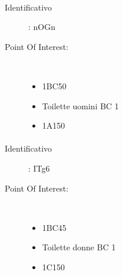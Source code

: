 \documentclass[../SperimentazioniPratiche.tex]{subfiles}
\begin{document}
			\paragraph*{}
			\label{01001}
			\begin{tcolorbox}[fonttitle=\bfseries, 
								adjusted title={\Large Beacon 01001},
								sharp corners=south,
								colback=white, 
								colframe=white!50!blue!75!black]
								
				\begin{description}
					\item[Identificativo]: nOGn

					\tcbline					
					
					\item[Point Of Interest:] \ \par
					\begin{itemize}
						\item 1BC50
						\item Toilette uomini BC 1
						\item 1A150
					\end{itemize}					   				
				\end{description}  				
			\end{tcolorbox}
			
			\paragraph*{}
			\label{01002}
			\begin{tcolorbox}[fonttitle=\bfseries, 
								adjusted title={\Large Beacon 01002},
								sharp corners=south,
								colback=white, 
								colframe=white!50!blue!75!black]
								
				\begin{description}
					\item[Identificativo]: ITg6

					\tcbline					
					
					\item[Point Of Interest:] \ \par
					\begin{itemize}
						\item 1BC45
						\item Toilette donne BC 1
						\item 1C150
					\end{itemize}					   				
				\end{description}  				
			\end{tcolorbox}
			
\end{document}
